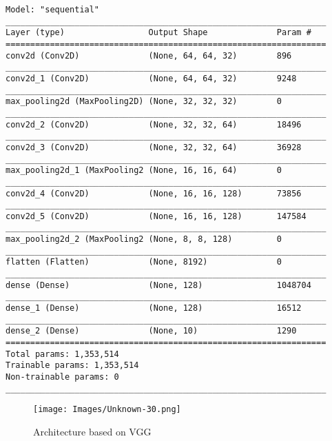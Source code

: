 \documentclass[11pt, a4paper]{article}
\begin{document}
\begin{verbatim}
Model: "sequential"
_________________________________________________________________
Layer (type)                 Output Shape              Param #   
=================================================================
conv2d (Conv2D)              (None, 64, 64, 32)        896       
_________________________________________________________________
conv2d_1 (Conv2D)            (None, 64, 64, 32)        9248      
_________________________________________________________________
max_pooling2d (MaxPooling2D) (None, 32, 32, 32)        0         
_________________________________________________________________
conv2d_2 (Conv2D)            (None, 32, 32, 64)        18496     
_________________________________________________________________
conv2d_3 (Conv2D)            (None, 32, 32, 64)        36928     
_________________________________________________________________
max_pooling2d_1 (MaxPooling2 (None, 16, 16, 64)        0         
_________________________________________________________________
conv2d_4 (Conv2D)            (None, 16, 16, 128)       73856     
_________________________________________________________________
conv2d_5 (Conv2D)            (None, 16, 16, 128)       147584    
_________________________________________________________________
max_pooling2d_2 (MaxPooling2 (None, 8, 8, 128)         0         
_________________________________________________________________
flatten (Flatten)            (None, 8192)              0         
_________________________________________________________________
dense (Dense)                (None, 128)               1048704   
_________________________________________________________________
dense_1 (Dense)              (None, 128)               16512     
_________________________________________________________________
dense_2 (Dense)              (None, 10)                1290      
=================================================================
Total params: 1,353,514
Trainable params: 1,353,514
Non-trainable params: 0
_________________________________________________________________
\end{verbatim}

\begin{figure}[htp]
\centering
\texttt{[image: Images/Unknown-30.png]} 
\caption{Architecture based on VGG}
\label{fig: vgg_arch}
\end{figure}

\clearpage
\end{document}
